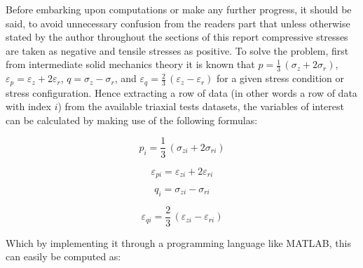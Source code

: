 \documentclass{article}
\begin{document}
\begin{par}
\begin{flushleft}
Before embarking upon computations or make any further progress, it should be said, to avoid unnecessary confusion from the readers part that unless otherwise stated by the author throughout the sections of this report compressive stresses are taken as negative and tensile stresses as positive. To solve the problem, first from intermediate solid mechanics theory it is known that $p=\frac{1}{3}\,\left(\sigma_{z}+2\sigma_{r}\right)$, $\varepsilon_{p}=\varepsilon_{z}+2\varepsilon_{r}$, $q=\sigma_{z}-\sigma_{r}$, and $\varepsilon_{q}=\frac{2}{3}\,\left(\varepsilon_{z}-\varepsilon_{r}\right)$ for a given stress condition or stress configuration. Hence extracting a row of data (in other words a row of data with index $i$) from the available triaxial tests datasets, the variables of interest can be calculated by making use of the following formulas:
\end{flushleft}
\end{par}

\begin{par}
$$p_{i}=\frac{1}{3}\,(\sigma_{zi}+2\sigma_{ri})$$ 
\end{par}

\begin{par}
$$\varepsilon_{pi}=\varepsilon_{zi}+2\varepsilon_{ri}$$
\end{par}

\begin{par}
$$q_{i}=\sigma_{zi}-\sigma_{ri}$$
\end{par}

\begin{par}
$$\varepsilon_{qi}=\frac{2}{3}\,(\varepsilon_{zi}-\varepsilon_{ri})$$
\end{par}

\begin{par}
\begin{flushleft}
Which by implementing it through a programming language like MATLAB, this can easily be computed as:
\end{flushleft}
\end{par}
\end{document}

